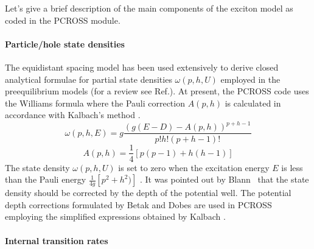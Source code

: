 Let's give a brief description of the main components of the exciton model
as coded in the PCROSS module.

\paragraph{Particle/hole state densities}

The equidistant spacing model has been used extensively to derive closed
analytical formulae for partial state densities $\omega (p,h,U)$ employed in
the preequilibrium models (for a review see Ref.\cite{RIPL2}). At present,
the PCROSS code uses the Williams formula \cite{Williams:71} where the Pauli
correction $A(p,h)$ is calculated in accordance with Kalbach's method \cite{Kalbach:83}.
\begin{equation}
\omega (p,h,E)=g\frac{\left( g(E-D)-A(p,h)\right) ^{p+h-1}}{p!h!(p+h-1)!}
\end{equation}%
\begin{equation*}
A(p,h)=\frac{1}{4}\left[ p(p-1)+h(h-1)\right]
\end{equation*}%
The state density $\omega (p,h,U)$ is set to zero when the excitation energy
$E$ is less than the Pauli energy $\frac{1}{4g}\left[ p^{2}+h^{2})\right] $
\cite{Baguer:89}. It was pointed out by Blann~\cite{Blann:72} that the state
density should be corrected by the depth of the potential well. The
potential depth corrections formulated by Betak and Dobes \cite{Betak:76} are
used in PCROSS employing the simplified expressions obtained by Kalbach \cite{Kalbach:77,Kalbach:83}.

\paragraph{Internal transition rates}

